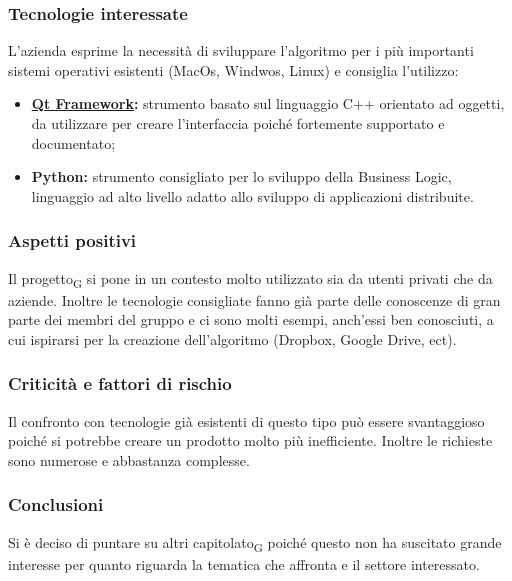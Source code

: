 \subsubsection{Tecnologie interessate}
L'azienda esprime la necessità di sviluppare l'algoritmo per i più importanti sistemi operativi esistenti (MacOs, Windwos, Linux) e consiglia l'utilizzo:
\begin{itemize}
\item \textbf{\href{https://wiki.qt.io/About_Qt}{Qt Framework}:} strumento basato sul linguaggio C++ orientato ad oggetti, da utilizzare per creare l'interfaccia poiché fortemente supportato e documentato;
\item \textbf{Python:} strumento consigliato per lo sviluppo della Business Logic, linguaggio ad alto livello adatto allo sviluppo di applicazioni distribuite.
\end{itemize}
\subsubsection{Aspetti positivi}
Il progetto\textsubscript{G} si pone in un contesto molto utilizzato sia da utenti privati che da aziende. Inoltre le tecnologie consigliate fanno già parte delle conoscenze di gran parte dei membri del gruppo e ci sono molti esempi, anch'essi ben conosciuti, a cui ispirarsi per la creazione dell'algoritmo (Dropbox, Google Drive, ect).
\subsubsection{Criticità e fattori di rischio}
Il confronto con tecnologie già esistenti di questo tipo può essere svantaggioso poiché si potrebbe creare un prodotto molto più inefficiente. Inoltre le richieste sono numerose e abbastanza complesse.
\subsubsection{Conclusioni}
Si è deciso di puntare su altri capitolato\textsubscript{G} poiché questo non ha suscitato grande interesse per quanto riguarda la tematica che affronta e il settore interessato.